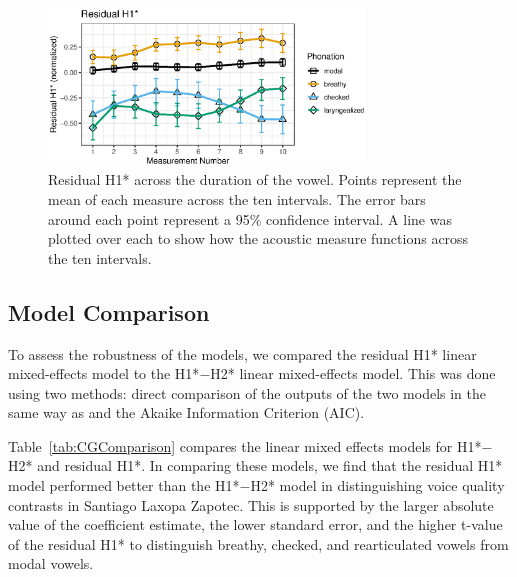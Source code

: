\begin{figure}[htbp]
  \centering
  \includegraphics[width = 0.75\textwidth]{images/Figure2.eps}
  \caption{\label{fig:FIG2}{Residual H1* across the duration of the vowel. Points represent the mean of each measure across the ten intervals. The error bars around each point represent a 95\% confidence interval. A line was plotted over each to show how the acoustic measure functions across the ten intervals.}}
\end{figure}


\subsection{Model Comparison} \label{sec:Comparison}

To assess the robustness of the models, we compared the residual H1* linear mixed-effects model to the H1*$-$H2* linear mixed-effects model. This was done using two methods: direct comparison of the outputs of the two models in the same way as \citet{chaiH1H2AcousticMeasure2022} and the Akaike Information Criterion (AIC). 

Table~\ref{tab:CGComparison} compares the linear mixed effects models for H1*$-$H2* and residual H1*. In comparing these models, we find that the residual H1* model performed better than the H1*$-$H2* model in distinguishing voice quality contrasts in Santiago Laxopa Zapotec. This is supported by the larger absolute value of the coefficient estimate, the lower standard error, and the higher t-value of the residual H1* to distinguish breathy, checked, and rearticulated vowels from modal vowels.

